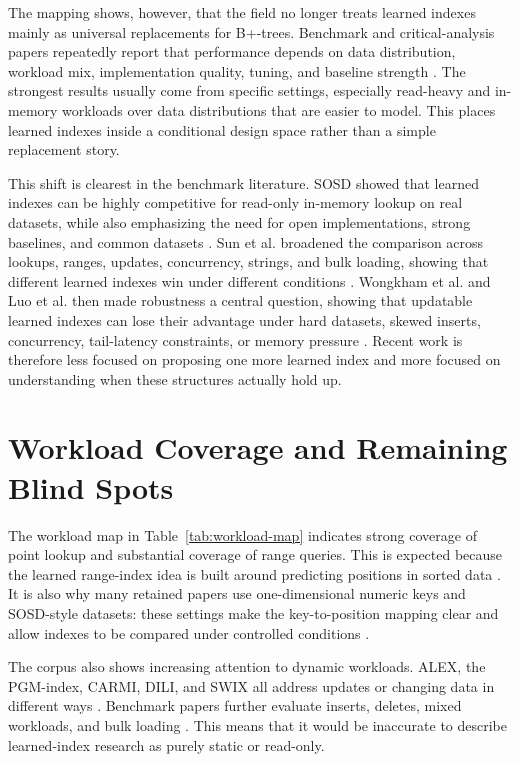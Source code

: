 \documentclass[a4paper, 12pt, twoside]{report}
\begin{document}
The mapping shows, however, that the field no longer treats learned indexes mainly as universal replacements for B+-trees. Benchmark and critical-analysis papers repeatedly report that performance depends on data distribution, workload mix, implementation quality, tuning, and baseline strength \cite{marcus2020benchmarking,sun2023learned,wongkham2022ready,maltry2022critical,luo2025robustness}. The strongest results usually come from specific settings, especially read-heavy and in-memory workloads over data distributions that are easier to model. This places learned indexes inside a conditional design space rather than a simple replacement story.

This shift is clearest in the benchmark literature. SOSD showed that learned indexes can be highly competitive for read-only in-memory lookup on real datasets, while also emphasizing the need for open implementations, strong baselines, and common datasets \cite{marcus2020benchmarking}. Sun et al. broadened the comparison across lookups, ranges, updates, concurrency, strings, and bulk loading, showing that different learned indexes win under different conditions \cite{sun2023learned}. Wongkham et al. and Luo et al. then made robustness a central question, showing that updatable learned indexes can lose their advantage under hard datasets, skewed inserts, concurrency, tail-latency constraints, or memory pressure \cite{wongkham2022ready,luo2025robustness}. Recent work is therefore less focused on proposing one more learned index and more focused on understanding when these structures actually hold up.

\section{Workload Coverage and Remaining Blind Spots}

The workload map in Table~\ref{tab:workload-map} indicates strong coverage of point lookup and substantial coverage of range queries. This is expected because the learned range-index idea is built around predicting positions in sorted data \cite{kraska2018}. It is also why many retained papers use one-dimensional numeric keys and SOSD-style datasets: these settings make the key-to-position mapping clear and allow indexes to be compared under controlled conditions \cite{marcus2020benchmarking,sun2023learned}.

The corpus also shows increasing attention to dynamic workloads. ALEX, the PGM-index, CARMI, DILI, and SWIX all address updates or changing data in different ways \cite{ding2020alex,ferragina2020pgm,zhang2022carmi,li2023dili,liang2024swix}. Benchmark papers further evaluate inserts, deletes, mixed workloads, and bulk loading \cite{wongkham2022ready,sun2023learned,luo2025robustness}. This means that it would be inaccurate to describe learned-index research as purely static or read-only.
\end{document}
